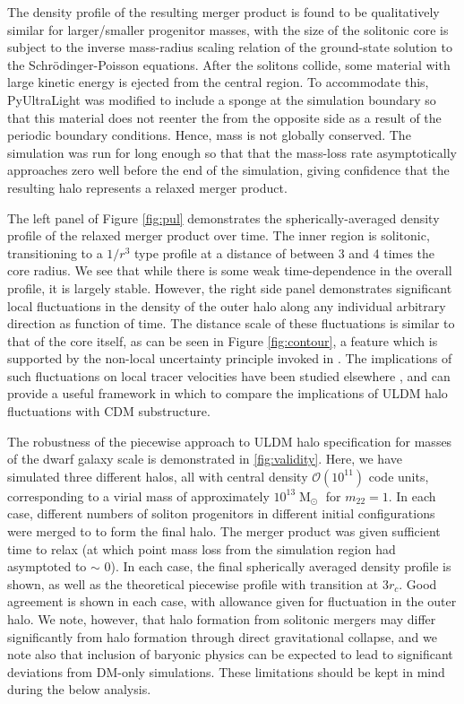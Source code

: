 \documentclass[a4paper,11pt]{article}
\begin{document}
The density profile of the resulting merger product is found to be qualitatively similar for larger/smaller progenitor masses, with the size of the solitonic core is subject to the inverse mass-radius scaling relation of the ground-state solution to the Schr{\"o}dinger-Poisson equations. After the solitons collide, some material with large kinetic energy is ejected from the central region. To accommodate this, {\sc PyUltraLight} was modified to include a sponge at the simulation boundary so that this material does not reenter the from the opposite side as a result of the periodic boundary conditions. Hence, mass is not globally conserved. The simulation was run for long enough so that that the mass-loss rate asymptotically approaches zero well before the end of the simulation, giving confidence that the resulting halo represents a relaxed merger product. 

The left panel of Figure \ref{fig:pul} demonstrates the spherically-averaged density profile of the relaxed merger product over time. The inner region is solitonic, transitioning to a $1/r^3$ type profile at a distance of between 3 and 4 times the core radius. We see that while there is some weak time-dependence in the overall profile, it is largely stable. However, the right side panel demonstrates significant local fluctuations in the density of the outer halo along any individual arbitrary direction as function of time. The distance scale of these fluctuations is similar to that of the core itself, as can be seen in Figure \ref{fig:contour}, a feature which is supported by the non-local uncertainty principle invoked in \cite{Schive:2014hza}. The implications of such fluctuations on local tracer velocities have been studied elsewhere \cite{Marsh:2018zyw}, and can provide a useful framework in which to compare the implications of ULDM halo fluctuations with CDM substructure. 

The robustness of the piecewise approach to ULDM halo specification for masses of the dwarf galaxy scale is demonstrated in \ref{fig:validity}.
Here, we have simulated three different halos, all with central density $\mathcal{O}(10^{11})$ code units, corresponding to a virial mass of approximately $10^{13}\operatorname{M}_{\odot}$ for $m_{22} = 1$. In each case, different numbers of soliton progenitors in different initial configurations were merged to to form the final halo. The merger product was given sufficient time to relax (at which point mass loss from the simulation region had asymptoted to $\sim$ 0). In each case, the final spherically averaged density profile is shown, as well as the theoretical piecewise profile with transition at $3 r_c$. Good agreement is shown in each case, with allowance given for fluctuation in the outer halo. We note, however, that halo formation from solitonic mergers may differ significantly from halo formation through direct gravitational collapse, and we note also that inclusion of baryonic physics can be expected to lead to significant deviations from DM-only simulations. These limitations should be kept in mind during the below analysis.
 
\end{document}
